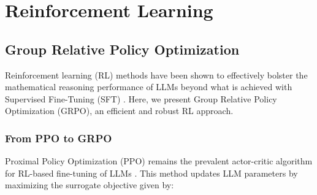 \section{Reinforcement Learning}

\subsection{Group Relative Policy Optimization} Reinforcement learning (RL) methods have been shown to effectively bolster the mathematical reasoning performance of LLMs beyond what is achieved with Supervised Fine-Tuning (SFT) \citep{wang2023math,wizardmath}. Here, we present Group Relative Policy Optimization (GRPO), an efficient and robust RL approach.

\subsubsection{From PPO to GRPO} Proximal Policy Optimization (PPO) \citep{schulman2017proximal} remains the prevalent actor-critic algorithm for RL-based fine-tuning of LLMs \citep{ouyang2022training}. This method updates LLM parameters by maximizing the surrogate objective given by:


